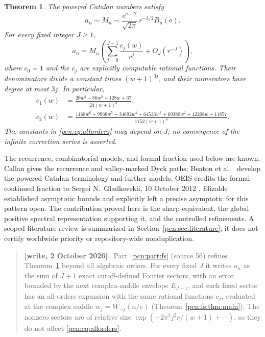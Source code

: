 \documentclass[11pt,letterpaper]{article}
\newtheorem{theorem}{Theorem}[section]
\theoremstyle{remark}\newtheorem{remark}[theorem]{Remark}
\newcommand{\ee}{\mathrm e}
\newenvironment{writenote}{\par\smallskip\begin{quote}\small\textbf{[write, 2 October 2026]}\ }{\end{quote}\smallskip}
\begin{document}
\begin{theorem}\label{pcn:thm:main}
The powered Catalan numbers satisfy
\begin{equation}\label{pcn:eq:leading}
 a_n\sim M_n\sim
 \frac{\ee^{\ee-2}}{\sqrt{2\pi}}\,r^{-3/2}B_n(\ee).
\end{equation}
For every fixed integer $J\ge1$,
\begin{equation}\label{pcn:eq:allorders}
 a_n=M_n\left(\sum_{j=0}^{J-1}\frac{c_j(w)}{r^j}
                    +O_J(r^{-J})\right),
\end{equation}
where $c_0=1$ and the $c_j$ are explicitly computable rational functions. Their denominators divide a constant times $(w+1)^{3j}$, and their numerators have degree at most $3j$. In particular,
\begin{align}
 c_1(w)&=\frac{20w^3+86w^2+128w+67}{24(w+1)^3},\label{pcn:eq:c1}\\
 c_2(w)&=\frac{1168w^6+9968w^5+34692w^4+64536w^3
                   +69380w^2+42208w+11857}{1152(w+1)^6}.\label{pcn:eq:c2}
\end{align}
The constants in \eqref{pcn:eq:allorders} may depend on $J$; no convergence of the infinite correction series is asserted.
\end{theorem}

The recurrence, combinatorial models, and formal fraction used below are known. Callan \cite{Callan} gives the recurrence and valley-marked Dyck paths; Beaton et al.\ \cite{Beaton} develop the powered-Catalan terminology and further models. OEIS credits the formal continued fraction to Sergei N.\ Gladkovskii, 10 October 2012 \cite{OEIS}. Elizalde \cite{Elizalde} established asymptotic bounds and explicitly left a precise asymptotic for this pattern open. The contribution proved here is the sharp equivalent, the global positive spectral representation supporting it, and the controlled refinements. A scoped literature review is summarized in Section~\ref{pcn:sec:literature}; it does not certify worldwide priority or repository-wide nonduplication.
\begin{writenote}
Part~\ref{pcn:part:fs} (source 56) refines Theorem~\ref{pcn:thm:main} beyond all algebraic orders. For every fixed $J$ it writes $a_n$ as the sum of $J+1$ exact cutoff-defined Fourier sectors, with an error bounded by the next complex-saddle envelope $E_{J+1}$, and each fixed sector has an all-orders expansion with the same rational functions $c_j$, evaluated at the complex saddle $w_j=W_{-j}(n/\ee)$ (Theorem~\ref{pcn:fs:thm:main}). The nonzero sectors are of relative size $\exp(-2\pi^2j^2r/(w+1)+\cdots)$, so they do not affect \eqref{pcn:eq:allorders}.
\end{writenote}
\end{document}
